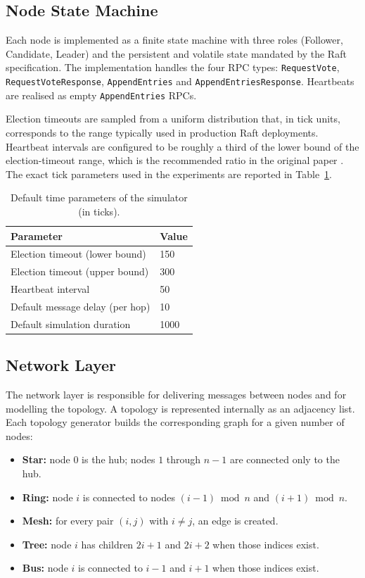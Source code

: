\subsection{Node State Machine}

Each node is implemented as a finite state machine with three roles (Follower, Candidate, Leader) and the persistent and volatile state mandated by the Raft specification. The implementation handles the four RPC types: \texttt{RequestVote}, \texttt{RequestVoteResponse}, \texttt{AppendEntries} and \texttt{AppendEntriesResponse}. Heartbeats are realised as empty \texttt{AppendEntries} RPCs.

Election timeouts are sampled from a uniform distribution that, in tick units, corresponds to the range typically used in production Raft deployments. Heartbeat intervals are configured to be roughly a third of the lower bound of the election-timeout range, which is the recommended ratio in the original paper \citep{ongaro2014}. The exact tick parameters used in the experiments are reported in Table~\ref{tab:tick_params}.

\begin{table}[H]
\centering
\caption{Default time parameters of the simulator (in ticks).}
\label{tab:tick_params}
\begin{tabular}{ll}
\toprule
\textbf{Parameter} & \textbf{Value} \\
\midrule
Election timeout (lower bound) & 150 \\
Election timeout (upper bound) & 300 \\
Heartbeat interval             & 50 \\
Default message delay (per hop) & 10 \\
Default simulation duration    & 1000 \\
\bottomrule
\end{tabular}
\end{table}

\subsection{Network Layer}

The network layer is responsible for delivering messages between nodes and for modelling the topology. A topology is represented internally as an adjacency list. Each topology generator builds the corresponding graph for a given number of nodes:

\begin{itemize}
    \item \textbf{Star:} node 0 is the hub; nodes $1$ through $n-1$ are connected only to the hub.
    \item \textbf{Ring:} node $i$ is connected to nodes $(i-1) \bmod n$ and $(i+1) \bmod n$.
    \item \textbf{Mesh:} for every pair $(i, j)$ with $i \neq j$, an edge is created.
    \item \textbf{Tree:} node $i$ has children $2i+1$ and $2i+2$ when those indices exist.
    \item \textbf{Bus:} node $i$ is connected to $i-1$ and $i+1$ when those indices exist.
\end{itemize}

